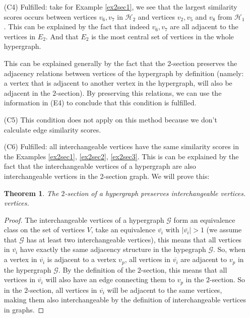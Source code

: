 \documentclass[a4paper,11pt]{report}
\newtheorem{theorem}{Theorem}[section]
\newcommand{\hgraf}{\mathcal{G}}
\newcommand{\hgrafeen}{\mathcal{H}}
\begin{document}
\begin{itemize}
  \item[(C4)] Fulfilled: take for Example \ref{ex2sec1}, we see that the largest similarity scores
  occurs between vertices $v_6, v_7$ 
  in $\hgrafeen_2$ and vertices $v_2, v_5$ and $v_8$ from $\hgrafeen_1$. This can 
  be explained by the fact that indeed $v_6,v_7$ are all adjacent to the vertices in $E_2$. And that $E_2$ is the 
  most central set of vertices in the whole hypergraph. 
  
  This can be explained 
  generally by the fact that the 2-section preserves the adjacency relations between 
  vertices of the hypergraph by definition (namely: a vertex that is adjacent to another vertex in the hypergraph, will also be adjacent in the $2$-section). By preserving this relations, we can 
  use the information in (E4) to conclude that this condition is fulfilled.
    \item[(C5)] This condition does not apply on this method because we don't calculate edge similarity scores.
   \item[(C6)] Fulfilled: all interchangeable vertices have the same similarity 
   scores in the Examples \ref{ex2sec1}, \ref{ex2sec2}, \ref{ex2sec3}. This is can be explained
   by the fact that the interchangeable vertices of a hypergraph are also 
   interchangeable vertices in the 2-section graph. We will prove this:
   
    \begin{theorem}
   The $2$-section of a hypergraph preserves interchangeable vertices.
   vertices. \end{theorem}
 \begin{proof}
   The interchangeable vertices of a hypergraph $\hgraf$ form an equivalence class on the set of vertices
   $V$, take an equivalence $\overline{v_i}$ with $|\overline{v_i}| > 1$ (we assume that $\hgraf$ has at least two interchangeable vertices),
   this means that all vertices in $\overline{v_i}$ have exactly the same adjacency structure in the hypegraph $\hgraf$.  
   So, when a vertex in $\overline{v_i}$ is adjacent to a vertex $v_p$, all 
   vertices in $\overline{v_i}$ are adjacent to $v_p$ in the hypergraph 
   $\hgraf$. By the definition of the $2$-section, this means that all vertices 
   in $\overline{v_i}$ will also have an edge connecting them to $v_p$ in the 
   $2$-section. So in the $2$-section, all vertices in $\overline{v_i}$ will be adjacent to 
  the same vertices, making them also interchangeable by the definition of interchangeable vertices in graphs.   
   

\end{proof}
\end{itemize}
\end{document}
